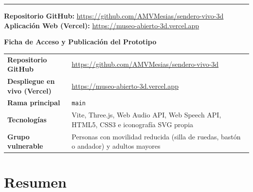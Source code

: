 \documentclass[12pt,letterpaper]{article}
\begin{document}
\begin{titlepage}
\vspace{0.55cm}
{\color{forestSage}\rule{0.72\textwidth}{0.5pt}}\par
\vspace{0.25cm}
{\fontsize{9.5}{13.5}\selectfont
\textbf{\color{forestDark}Repositorio GitHub:} \url{https://github.com/AMVMesias/sendero-vivo-3d} \\
\textbf{\color{forestDark}Aplicación Web (Vercel):} \url{https://museo-abierto-3d.vercel.app}\par}

\vfill
\end{titlepage}

\setcounter{page}{2}

\noindent\textbf{Ficha de Acceso y Publicación del Prototipo}
\vspace{4pt}

\begingroup
{}
\fontsize{10}{13}\selectfont
\noindent\begin{tabularx}{\textwidth}{@{}L{4.2cm} >{\raggedright\arraybackslash}X@{}}
\toprule
\textbf{Repositorio GitHub} & \url{https://github.com/AMVMesias/sendero-vivo-3d} \\
\textbf{Despliegue en vivo (Vercel)} & \url{https://museo-abierto-3d.vercel.app} \\
\textbf{Rama principal} & \texttt{main} \\
\textbf{Tecnologías} & Vite, Three.js, Web Audio API, Web Speech API, HTML5, CSS3 e iconografía SVG propia \\
\textbf{Grupo vulnerable} & Personas con movilidad reducida (silla de ruedas, bastón o andador) y adultos mayores \\
\bottomrule
\end{tabularx}
\endgroup

\vspace{0.45cm}

\doublespacing

\section{Resumen}
\end{document}
